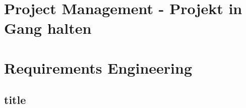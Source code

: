 \documentclass[a4paper]{article}
\begin{document}
\newpage
		
	\section{Project Management - Projekt in Gang halten}
	
		
		
		
		
		
		
\newpage
				
	\section{Requirements Engineering}
	
		\subsection{title}
		
		
		
		
		
	
	
\end{document}
